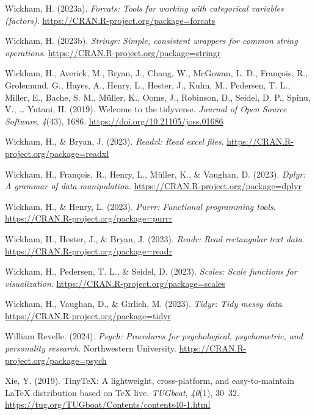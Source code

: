 \documentclass[
  man,floatsintext]{apa7}
\newlength{\cslhangindent}
\newlength{\cslentryspacingunit} %
\newenvironment{CSLReferences}[2] %
 {%
  \setlength{\parindent}{0pt}
  \ifodd #1
  \let\oldpar\par
  \def\par{\hangindent=\cslhangindent\oldpar}
  \fi
  \setlength{\parskip}{#2\cslentryspacingunit}
 }%
 {}
\begin{document}
\begin{CSLReferences}{1}{0}
\leavevmode{}%
Wickham, H. (2023a). \emph{Forcats: Tools for working with categorical variables (factors)}. \url{https://CRAN.R-project.org/package=forcats}

\leavevmode{}%
Wickham, H. (2023b). \emph{Stringr: Simple, consistent wrappers for common string operations}. \url{https://CRAN.R-project.org/package=stringr}

\leavevmode{}%
Wickham, H., Averick, M., Bryan, J., Chang, W., McGowan, L. D., François, R., Grolemund, G., Hayes, A., Henry, L., Hester, J., Kuhn, M., Pedersen, T. L., Miller, E., Bache, S. M., Müller, K., Ooms, J., Robinson, D., Seidel, D. P., Spinu, V., \ldots{} Yutani, H. (2019). Welcome to the {tidyverse}. \emph{Journal of Open Source Software}, \emph{4}(43), 1686. \url{https://doi.org/10.21105/joss.01686}

\leavevmode{}%
Wickham, H., \& Bryan, J. (2023). \emph{Readxl: Read excel files}. \url{https://CRAN.R-project.org/package=readxl}

\leavevmode{}%
Wickham, H., François, R., Henry, L., Müller, K., \& Vaughan, D. (2023). \emph{Dplyr: A grammar of data manipulation}. \url{https://CRAN.R-project.org/package=dplyr}

\leavevmode{}%
Wickham, H., \& Henry, L. (2023). \emph{Purrr: Functional programming tools}. \url{https://CRAN.R-project.org/package=purrr}

\leavevmode{}%
Wickham, H., Hester, J., \& Bryan, J. (2023). \emph{Readr: Read rectangular text data}. \url{https://CRAN.R-project.org/package=readr}

\leavevmode{}%
Wickham, H., Pedersen, T. L., \& Seidel, D. (2023). \emph{Scales: Scale functions for visualization}. \url{https://CRAN.R-project.org/package=scales}

\leavevmode{}%
Wickham, H., Vaughan, D., \& Girlich, M. (2023). \emph{Tidyr: Tidy messy data}. \url{https://CRAN.R-project.org/package=tidyr}

\leavevmode{}%
William Revelle. (2024). \emph{Psych: Procedures for psychological, psychometric, and personality research}. Northwestern University. \url{https://CRAN.R-project.org/package=psych}

\leavevmode{}%
Xie, Y. (2019). TinyTeX: A lightweight, cross-platform, and easy-to-maintain LaTeX distribution based on TeX live. \emph{TUGboat}, \emph{40}(1), 30--32. \url{https://tug.org/TUGboat/Contents/contents40-1.html}

\end{CSLReferences}
\end{document}
